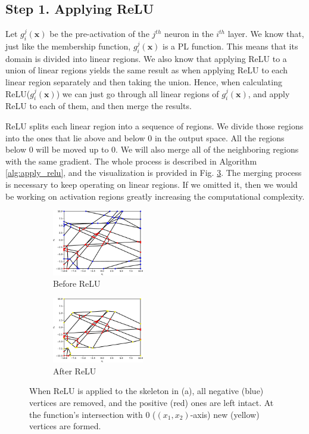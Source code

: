 \documentclass{article}
\begin{document}
\subsection{Step 1. Applying ReLU}

Let $g_i^j(\mathbf{x})$ be the pre-activation of the $j^{th}$ neuron in the $i^{th}$ layer. We know that, just like the membership function, $g_i^j(\mathbf{x})$ is a PL function. This means that its domain is divided into linear regions. We also know that applying ReLU to a union of linear regions yields the same result as when applying ReLU to each linear region separately and then taking the union. Hence, when calculating ReLU($g_i^j(\mathbf{x})$) we can just go through all linear regions of $g_i^j(\mathbf{x})$, and apply ReLU to each of them, and then merge the results. 

ReLU splits each linear region into a sequence of regions. We divide those regions into the ones that lie above and below $0$ in the output space. All the regions below $0$ will be moved up to $0$. We will also merge all of the neighboring regions with the same gradient. The whole process is described in Algorithm \ref{alg:apply_relu}, and the visualization is provided in Fig. \ref{fig:example_of_applying_relu}. The merging process is necessary to keep operating on linear regions. If we omitted it, then we would be working on activation regions greatly increasing the computational complexity. 

\begin{figure}[t]
    \begin{subfigure}{4cm}
        \centering
        \includegraphics[width=4cm]{Figures/skeleton_before_relu.pdf}
        \caption{Before ReLU}
        \label{fig:skeleton_before_relu}
    \end{subfigure}
    \begin{subfigure}{4cm}
        \centering
        \includegraphics[width=4cm]{Figures/skeleton_after_relu.pdf}
        \caption{After ReLU}
        \label{fig:skeleton_after_relu}
    \end{subfigure}
    \caption{When ReLU is applied to the skeleton in (a), all negative (blue) vertices are removed, and the positive (red) ones are left intact. At the function's intersection with $0$ ($(x_1, x_2)$-axis) new (yellow) vertices are formed.}
    \label{fig:example_of_applying_relu}
\end{figure}
\end{document}
